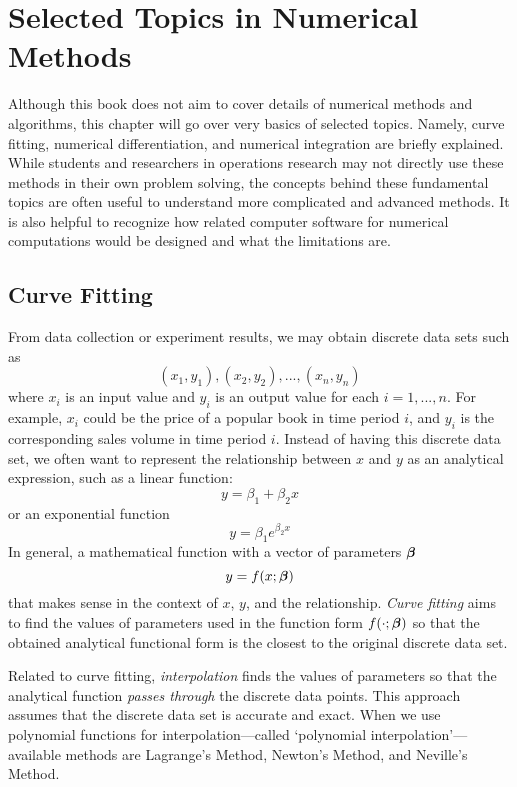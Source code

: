 \chapter{Selected Topics in Numerical Methods}

Although this book does not aim to cover details of numerical methods and algorithms, this chapter will go over very basics of selected topics. Namely, curve fitting, numerical differentiation, and numerical integration are briefly explained. While students and researchers in operations research may not directly use these methods in their own problem solving, the concepts behind these fundamental topics are often useful to understand more complicated and advanced methods. It is also helpful to recognize how related computer software for numerical computations would be designed and what the limitations are.


\section{Curve Fitting}

From data collection or experiment results, we may obtain discrete data sets such as
\[
	(x_1, y_1), (x_2, y_2), ..., (x_n, y_n)
\]
where $x_i$ is an input value and $y_i$ is an output value for each $i=1,...,n$. For example, $x_i$ could be the price of a popular book in time period $i$, and $y_i$ is the corresponding sales volume in time period $i$. Instead of having this discrete data set, we often want to represent the relationship between $x$ and $y$ as an analytical expression, such as a linear function:
\[
	y = \beta_1 + \beta_2 x
\]
or an exponential function
\[
	y = \beta_1 e^{\beta_2 x}
\]
In general, a mathematical function with a vector of parameters $\boldsymbol{\beta}$
\[
	y = f(x; \boldsymbol{\beta})
\]
that makes sense in the context of $x$, $y$, and the relationship. \emph{Curve fitting} aims to find the values of parameters used in the function form $f(\cdot; \boldsymbol{\beta})$ so that the obtained analytical functional form is the closest to the original discrete data set.

Related to curve fitting, \emph{interpolation} finds the values of parameters so that the analytical function \emph{passes through} the discrete data points. This approach assumes that the discrete data set is accurate and exact. When we use polynomial functions for interpolation---called `polynomial interpolation'---available methods are Lagrange's Method, Newton's Method, and Neville's Method.

